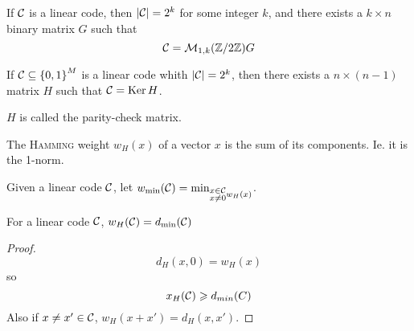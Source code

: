 \begin{proposition}
    If $\mathcal{C}$ is a linear code, then $\left\lvert\mathcal{C}\right\rvert = 2^k$ for some integer $k$, and there exists a $k\times n$ binary matrix $G$ such that
    \[
        \mathcal{C} = \mathcal{M}_{1,k}(\mathbb{Z}/2\mathbb{Z})G    
    \]
\end{proposition}

\begin{proposition}
    If $\mathcal{C}\subseteq \left\{ 0,1 \right\}^M$ is a linear code whith $\left\lvert\mathcal{C}\right\rvert = 2^k$, then there exists a $n\times(n-1)$ matrix $H$ such that $\mathcal{C} = \operatorname{Ker} H$.
\end{proposition}

$H$ is called the parity-check matrix.

\begin{definition}
    The \textsc{Hamming} weight $w_H(x)$ of a vector $x$ is the sum of its components. Ie. it is the 1-norm.
\end{definition}

\begin{definition}
    Given a linear code $\mathcal{C}$, let $w_{\min}(\mathcal{C}) = \min_{\substack{x\in\mathcal{C}\\x\neq 0}w_H(x)}$.
\end{definition}

\begin{theorem}
    For a linear code $\mathcal{C}$, $w_H(\mathcal{C}) = d_{\min}(\mathcal{C})$
\end{theorem}
\begin{proof}
    \[
        d_H(x,0) = w_H(x)
    \]
    so
    \[
        x_H(\mathcal{C}) \geqslant d_{min}(C)
    \]
    Also if $x\neq x' \in \mathcal{C}$, $w_H(x+x') = d_H(x,x')$.
\end{proof}

